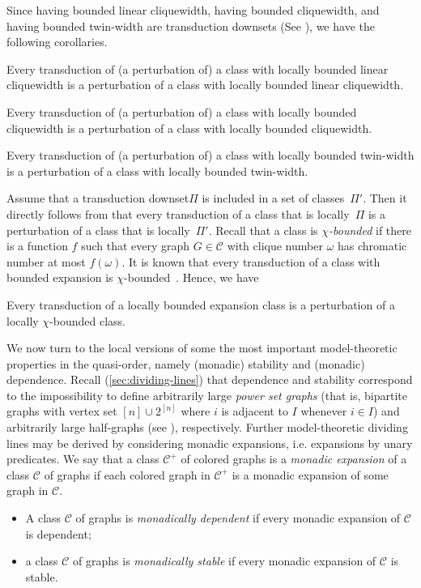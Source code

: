 \documentclass{lmcs}
\newcommand{\Cc}{\mathscr{C}}
\theoremstyle{definition}
\newcommand{\dset}{downset\xspace}
\begin{document}
Since having bounded linear cliquewidth, having bounded cliquewidth, and having bounded twin-width are transduction {\dset}s (See \cite{colcombet2007combinatorial,twin-width1}), we have
the following corollaries.

\begin{cor}
	\label{cor:loc_lcw}
	Every transduction of (a perturbation of) a class with locally bounded linear cliquewidth is a perturbation of a class with locally bounded linear cliquewidth.
\end{cor}	
\begin{cor}
	\label{cor:loc_cw}
	Every transduction of (a perturbation of) a class with locally bounded cliquewidth is a perturbation of a class with locally bounded cliquewidth.
\end{cor}	
\begin{cor}
	\label{cor:loc_tww}
	Every transduction of (a perturbation of) a class with locally bounded twin-width is a perturbation of a class with locally bounded twin-width.
\end{cor}	

Assume that a transduction \dset $\Pi$ is included in a set of classes~$\Pi'$. Then it directly follows from 
 that every transduction of a class that is locally~$\Pi$ is a perturbation of a class that is locally~$\Pi'$. 
Recall that a class is \emph{$\chi$-bounded} if there is a function $f$ such that every graph $G\in\mathscr C$ with clique number $\omega$ has chromatic number at most $f(\omega)$.
It is known that  every transduction of a class with bounded expansion is $\chi$-bounded~\cite[Corollary 4.1]{nevsetril2020rankwidth}. Hence, we have

\begin{cor}
	\label{cor:loc_SBE}
	Every transduction of a  locally bounded expansion class is a perturbation of a locally $\chi$-bounded class.
\end{cor}	



We now turn to the local versions of some the most important model-theoretic properties in the quasi-order, namely (monadic) stability and (monadic) dependence. Recall (\cref{sec:dividing-lines}) that dependence and stability correspond to the impossibility to define arbitrarily large \emph{power set graphs} (that is, bipartite graphs with vertex set $[n]\cup 2^{[n]}$ where $i$ is adjacent to $I$ whenever $i\in I$) and arbitrarily large half-graphs (see ), respectively.
Further model-theoretic dividing lines may be derived by considering monadic expansions, i.e. expansions by unary predicates. We say that a class $\Cc^+$ of 
colored graphs is a \emph{monadic expansion} of a class $\Cc$ of graphs if each colored graph in $\Cc^+$ is a monadic expansion of some graph in $\Cc$. 
\begin{itemize}
	\item A class $\Cc$ of graphs is \emph{monadically dependent} if every monadic expansion of $\Cc$ is dependent;
	\item a class $\Cc$ of graphs is \emph{monadically stable} if every monadic expansion of $\Cc$ is stable.
\end{itemize}
\end{document}
